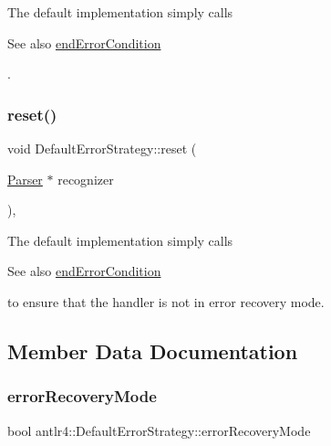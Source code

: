 The default implementation simply calls \begin{DoxySeeAlso}{See also}
\hyperlink{classantlr4_1_1DefaultErrorStrategy_ae04080b08ef36ab9586fe2273ce960f0}{end\+Error\+Condition}


\end{DoxySeeAlso}
. 

\mbox{\label{classantlr4_1_1DefaultErrorStrategy_a09526cdda0619309a8063dbfe8138c2d}} 
\subsubsection{\texorpdfstring{reset()}{reset()}}
{\footnotesize\ttfamily void Default\+Error\+Strategy\+::reset (\begin{DoxyParamCaption}\item[{\hyperlink{classantlr4_1_1Parser}{Parser} $\ast$}]{recognizer }\end{DoxyParamCaption})\hspace{0.3cm}{\ttfamily [override]}, {\ttfamily [virtual]}}



The default implementation simply calls \begin{DoxySeeAlso}{See also}
\hyperlink{classantlr4_1_1DefaultErrorStrategy_ae04080b08ef36ab9586fe2273ce960f0}{end\+Error\+Condition}


\end{DoxySeeAlso}
to ensure that the handler is not in error recovery mode. 



\subsection{Member Data Documentation}
\mbox{\label{classantlr4_1_1DefaultErrorStrategy_a612c641ac64e59200bfeaf1f52b8e31e}} 
\subsubsection{\texorpdfstring{error\+Recovery\+Mode}{errorRecoveryMode}}
{\footnotesize\ttfamily bool antlr4\+::\+Default\+Error\+Strategy\+::error\+Recovery\+Mode\hspace{0.3cm}{\ttfamily [protected]}}

